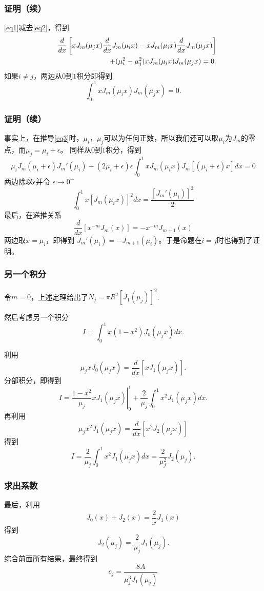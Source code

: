 \documentclass[CJK]{beamer}
\begin{document}
\begin{frame}
  \frametitle{证明（续）}
  
  \eqref{eq1}减去\eqref{eq2}，得到
  \begin{eqnarray}
 && \frac{d}{dx}\left[ xJ_m(\mu_jx)\frac{d}{dx} J_m(\mu_i x) - xJ_m(\mu_ix)\frac{d}{dx} J_m(\mu_j x) \right] \nonumber \\
  && + (\mu_i^2-\mu_j^2)xJ_m(\mu_ix)J_m(\mu_jx) = 0. \label{eq3}
  \end{eqnarray}
  如果$i\ne j$，两边从$0$到$1$积分即得到
  $$\int_0^1 xJ_m(\mu_ix)J_m(\mu_jx) = 0. $$
  
\end{frame}


\begin{frame}
  \frametitle{证明（续）}
  
  事实上，在推导\eqref{eq3}时，$\mu_i$，$\mu_j$可以为任何正数，所以我们还可以取$\mu_i$为$J_m$的零点，而$\mu_j = \mu_i +\epsilon$。
    同样从$0$到$1$积分，得到
    $$ \mu_iJ_m(\mu_i+\epsilon) J_m'(\mu_i)  -(2\mu_i+\epsilon)\epsilon\int_0^1xJ_m(\mu_ix)J_m[(\mu_i+\epsilon)x]dx = 0 $$
    两边除以$\epsilon$并令 $\epsilon\rightarrow 0^+$
    $$ \int_0^1x\left[J_m(\mu_ix)\right]^2dx = \frac{[J_m'(\mu_i)]^2}{2} $$
    最后，在递推关系
    $$\frac{d}{dx}\left[x^{-m}J_m(x)\right] = -x^{-m} J_{m+1}(x)$$
  两边取$x = \mu_i$，即得到 $J_m'(\mu_i) = -J_{m+1}(\mu_i)$。于是命题在$i=j$时也得到了证明。
    
  
\end{frame}


\begin{frame}
  \frametitle{另一个积分}
  令$m=0$，上述定理给出了$N_j = \pi R^2\left[J_1(\mu_j)\right]^2$.

  然后考虑另一个积分
  $$I =   \int_0^1x\left(1-x^2\right)J_0(\mu_jx)dx. $$
\end{frame}

\begin{frame}
  利用
  $$ \mu_jxJ_0(\mu_j x) = \frac{d}{dx} \left[xJ_1(\mu_jx)\right]. $$
  分部积分，即得到
  $$I = \left.\frac{1-x^2}{\mu_j} xJ_1(\mu_jx) \right\vert_0^1 + \frac{2}{\mu_j} \int_0^1 x^2J_1(\mu_jx) dx. $$
  再利用
  $$\mu_jx^2J_1(\mu_j x) = \frac{d}{dx}\left[x^2J_2(\mu_j x)\right] $$
  得到
  $$I  =  \frac{2}{\mu_j} \int_0^1 x^2J_1(\mu_jx) dx = \frac{2}{\mu_j^2}J_2(\mu_j). $$
  
\end{frame}


\begin{frame}
  \frametitle{求出系数}
  
  最后，利用
  $$J_0(x)+J_2(x) = \frac{2}{x}J_1(x)$$
  得到
  $$J_2(\mu_j) = \frac{2}{\mu_j}J_1(\mu_j).$$
  综合前面所有结果，最终得到
  $$ c_j = \frac{8A}{\mu_j^3J_1(\mu_j)} $$
  
\end{frame}
\end{document}
